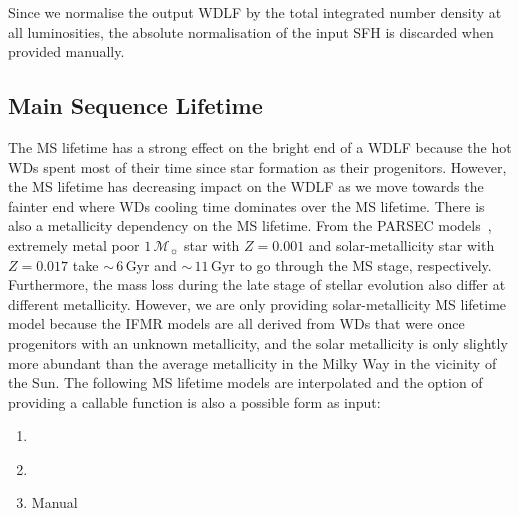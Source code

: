 \documentclass[fleqn,usenatbib]{rasti}
\newcommand{\msun}{\mathcal{M}_{\sun}}
\begin{document}
Since we normalise the output WDLF by the total integrated number density at
all luminosities, the absolute normalisation of the input SFH is discarded when
provided manually.

\subsection{Main Sequence Lifetime}
The MS lifetime has a strong effect on the bright end of a WDLF because the hot
WDs spent most of their time since star formation as their progenitors.
However, the MS lifetime has decreasing impact on the WDLF as we move towards
the fainter end where WDs cooling time dominates over the MS lifetime. There is
also a metallicity dependency on the MS lifetime. From the PARSEC
models~\citep{2013EPJWC..4303001B}, extremely metal poor $1\,\msun$ star with
$Z=0.001$ and solar-metallicity star with $Z=0.017$ take $\sim$\,$6$\,Gyr and
$\sim$\,$11$\,Gyr to go through the MS stage, respectively. Furthermore,
the mass loss during the late stage of stellar evolution also differ at
different metallicity. However, we are only providing solar-metallicity
MS lifetime model because the IFMR models are all derived from WDs that
were once progenitors with an unknown metallicity, and the solar metallicity
is only slightly more abundant than the average metallicity in the Milky Way
in the vicinity of the Sun. The following MS lifetime models are interpolated and
the option of providing a callable function is also a possible form as input:

\begin{enumerate}
    \item \citet{2013EPJWC..4303001B}
    \item \citet{2016ApJ...823..102C}
    \item Manual
\end{enumerate}
\end{document}
